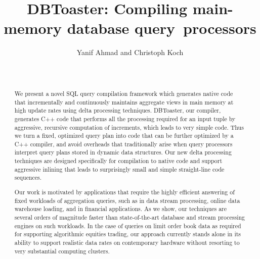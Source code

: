 \documentclass{vldb}
\title{DBToaster: Compiling main-memory database query~processors}
\author{
\alignauthor Yanif Ahmad and Christoph Koch \\
\affaddr{Department of Computer Science} \\
\affaddr{Cornell University, Ithaca, NY} \\
\email{\{yanif, koch\}@cs.cornell.edu}}
\date{}
\begin{document}
\maketitle


\begin{abstract}
We  present a novel  SQL query  compilation framework  which generates native 
code that incrementally  and continuously  maintains aggregate views  in main 
memory at  high  update rates  using delta  processing techniques. DBToaster, 
our compiler, generates C++  code that  performs all the  processing required 
for an input  tuple by aggressive, recursive computation of increments, which leads to very simple code. Thus we turn  a fixed,
optimized query plan into code that can be further optimized by a C++ compiler,
and avoid overheads that traditionally arise when query processors interpret
query plans stored in dynamic data structures. Our new delta processing
techniques are designed specifically for compilation to native code and support
aggressive inlining that leads to surprisingly small and simple straight-line
code sequences.

Our  work  is  motivated  by  applications  that  require  the  highly
efficient answering of fixed workloads of aggregation queries, such as
in  data stream  processing,  online data  warehouse  loading, and  in
financial applications. As we  show, our techniques are several orders
of  magnitude   faster  than  state-of-the-art   database  and  stream
processing engines on such workloads.  In the case of queries on limit
order  book  data  as  required for  supporting  algorithmic  equities
trading, our approach currently stands alone in its ability to support
realistic  data rates  on contemporary  hardware without  resorting to
very substantial computing clusters.
\end{abstract}









\small{


}
\end{document}
